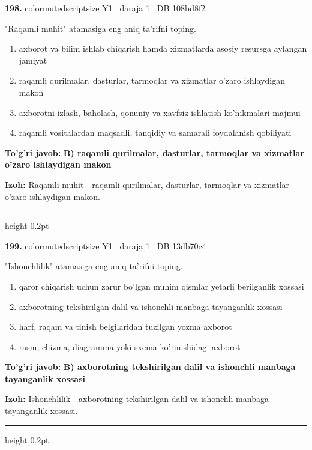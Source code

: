\documentclass[10pt,a4paper,oneside]{article}
\begin{document}
\noindent\textbf{\color{ink}198.}  {color{muted}scriptsize Y1 \textbullet\ daraja 1 \textbullet\ DB 108bd8f2}
\par
"Raqamli muhit" atamasiga eng aniq ta'rifni toping.
\begin{enumerate}[label=\Alph*),leftmargin=9mm]
\item axborot va bilim ishlab chiqarish hamda xizmatlarda asosiy resursga aylangan jamiyat
\item raqamli qurilmalar, dasturlar, tarmoqlar va xizmatlar o'zaro ishlaydigan makon
\item axborotni izlash, baholash, qonuniy va xavfsiz ishlatish ko'nikmalari majmui
\item raqamli vositalardan maqsadli, tanqidiy va samarali foydalanish qobiliyati
\end{enumerate}
\begin{tcolorbox}[enhanced,breakable,colback=teal!4,colframe=teal!50!black,boxrule=0.5pt,arc=1.1mm,left=3mm,right=3mm,top=1.7mm,bottom=1.7mm,before skip=2mm,after skip=2mm]
\textbf{\color{teal}To'g'ri javob:} \textbf{B) raqamli qurilmalar, dasturlar, tarmoqlar va xizmatlar o'zaro ishlaydigan makon}
\par\smallskip
\textbf{Izoh:} Raqamli muhit - raqamli qurilmalar, dasturlar, tarmoqlar va xizmatlar o'zaro ishlaydigan makon.
\end{tcolorbox}
\vspace{2mm}\hrule height 0.2pt \vspace{3mm}

\noindent\textbf{\color{ink}199.}  {color{muted}scriptsize Y1 \textbullet\ daraja 1 \textbullet\ DB 13db70c4}
\par
"Ishonchlilik" atamasiga eng aniq ta'rifni toping.
\begin{enumerate}[label=\Alph*),leftmargin=9mm]
\item qaror chiqarish uchun zarur bo'lgan muhim qismlar yetarli berilganlik xossasi
\item axborotning tekshirilgan dalil va ishonchli manbaga tayanganlik xossasi
\item harf, raqam va tinish belgilaridan tuzilgan yozma axborot
\item rasm, chizma, diagramma yoki sxema ko'rinishidagi axborot
\end{enumerate}
\begin{tcolorbox}[enhanced,breakable,colback=teal!4,colframe=teal!50!black,boxrule=0.5pt,arc=1.1mm,left=3mm,right=3mm,top=1.7mm,bottom=1.7mm,before skip=2mm,after skip=2mm]
\textbf{\color{teal}To'g'ri javob:} \textbf{B) axborotning tekshirilgan dalil va ishonchli manbaga tayanganlik xossasi}
\par\smallskip
\textbf{Izoh:} Ishonchlilik - axborotning tekshirilgan dalil va ishonchli manbaga tayanganlik xossasi.
\end{tcolorbox}
\vspace{2mm}\hrule height 0.2pt \vspace{3mm}
\end{document}
